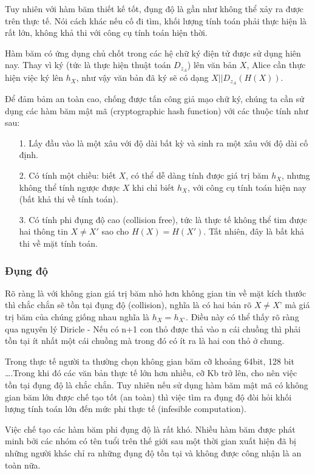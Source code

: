 \documentclass[a4paper,12pt]{report}
\begin{document}
Tuy nhiên với hàm băm thiết kế tốt, đụng độ là gần như không thể xảy ra được trên thực tế. Nói cách khác nếu cố đi tìm, khối lượng tính toán phải thực hiện là rất lớn, không khả thi với công cụ tính toán hiện thời.

Hàm băm có ứng dụng chủ chốt trong các hệ chữ ký điện tử được sử dụng hiên nay. Thay vì ký (tức là thực hiện thuật toán $D_{z_A}$) lên văn bản $X$, Alice cần thực hiện việc ký lên $h_X$, như vậy văn bản đã ký sẽ có dạng $X || D_{z_A}(H(X))$.

Để đảm bảm an toàn cao, chống được tấn công giả mạo chữ ký, chúng ta cần sử dụng các hàm băm mật mã (cryptographic hash function) với các thuộc tính như sau:
\begin{itemize}
\item[1. ] Lấy đầu vào là một xâu với độ dài bất kỳ và sinh ra một xâu với độ dài cố định.
\item[2. ] Có tính một chiều: biết $X$, có thể dễ dàng tính được giá trị băm $h_X$, nhưng không thể tính ngược được $X$ khi chỉ biết $h_X$, với công cụ tính toán hiện nay (bất khả thi về tính toán).
\item[3. ] Có tính phi đụng độ cao (collision free), tức là thực tế không thể tim được hai thông tin $X \neq X'$ sao cho $H(X) = H(X')$. Tất nhiên, đây là bất khả thi về mặt tính toán.
\end{itemize}
\subsubsection{Đụng độ}
Rõ ràng là với không gian giá trị băm nhỏ hơn không gian tin về mặt kích thước thì chắc chắn sẽ tồn tại đụng độ (collision), nghĩa là có hai bản rõ $X \neq X’$ mà giá trị băm của chúng giống nhau nghĩa là $h_X=h_{X’}$. Điều này có thể thấy rõ ràng qua nguyên lý Diricle - Nếu có n+1 con thỏ được thả vào n cái chuồng thì phải tồn tại ít nhất một cái chuồng mà trong đó có ít ra là hai con thỏ ở chung.

Trong thực tế người ta thường chọn không gian băm cỡ khoảng 64bit, 128 bit \ldots .Trong khi đó các văn bản thực tế lớn hơn nhiều, cỡ Kb trở lên, cho nên việc tồn tại đụng độ là chắc chắn. Tuy nhiên nếu sử dụng hàm băm mật mã có không gian băm lớn được chế tạo tốt (an toàn) thì việc tìm ra đụng độ đòi hỏi khối lượng tính toán lớn đến mức phi thực tế (infesible computation).

Việc chế tạo các hàm băm phi đụng độ là rất khó. Nhiều hàm băm được phát minh bởi các nhóm có tên tuổi trên thế giới sau một thời gian xuất hiện đã bị những người khác chỉ ra những đụng độ tồn tại và không được công nhận là an toàn nữa.
\end{document}
